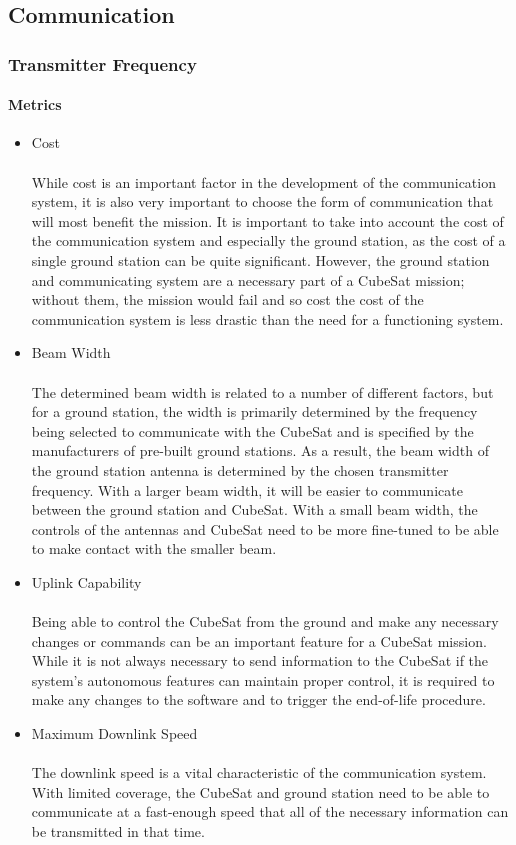 \documentclass[3p]{elsarticle}
\begin{document}
\subsection{Communication}
\subsubsection{Transmitter Frequency}
\paragraph{Metrics}
\begin{itemize}
    \item Cost \\
    \\
While cost is an important factor in the development of the communication system, it is also very important to choose the form of communication that will most benefit the mission. It is important to take into account the cost of the communication system and especially the ground station, as the cost of a single ground station can be quite significant. However, the ground station and communicating system are a necessary part of a CubeSat mission; without them, the mission would fail and so cost the cost of the communication system is less drastic than the need for a functioning system. 
    \item Beam Width \\
    \\
The determined beam width is related to a number of different factors, but for a ground station, the width is primarily determined by the frequency being selected to communicate with the CubeSat and is specified by the manufacturers of pre-built ground stations. As a result, the beam width of the ground station antenna is determined by the chosen transmitter frequency. With a larger beam width, it will be easier to communicate between the ground station and CubeSat. With a small beam width, the controls of the antennas and CubeSat need to be more fine-tuned to be able to make contact with the smaller beam.
    \item Uplink Capability \\
    \\
Being able to control the CubeSat from the ground and make any necessary changes or commands can be an important feature for a CubeSat mission. While it is not always necessary to send information to the CubeSat if the system’s autonomous features can maintain proper control, it is required to make any changes to the software and to trigger the end-of-life procedure.
    \item Maximum Downlink Speed \\
    \\
The downlink speed is a vital characteristic of the communication system. With limited coverage, the CubeSat and ground station need to be able to communicate at a fast-enough speed that all of the necessary information can be transmitted in that time.
\end{itemize}
\end{document}
